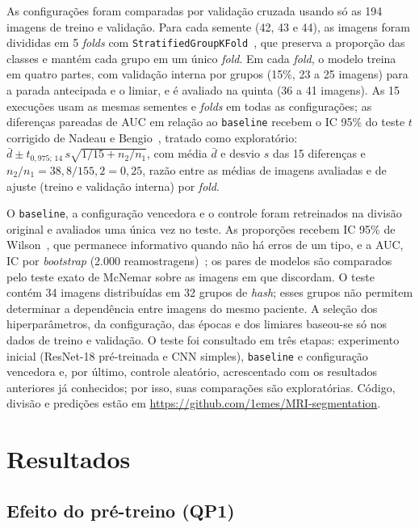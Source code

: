 \documentclass[conference]{IEEEtran}
\begin{document}
As configurações foram comparadas por validação cruzada usando só as 194 imagens de treino e validação. Para cada semente (42, 43 e 44), as imagens foram divididas em 5 \textit{folds} com \texttt{StratifiedGroupKFold}~\cite{pedregosa2011sklearn}, que preserva a proporção das classes e mantém cada grupo em um único \textit{fold}. Em cada \textit{fold}, o modelo treina em quatro partes, com validação interna por grupos (15\%, 23 a 25 imagens) para a parada antecipada e o limiar, e é avaliado na quinta (36 a 41 imagens). As 15 execuções usam as mesmas sementes e \textit{folds} em todas as configurações; as diferenças pareadas de AUC em relação ao \texttt{baseline} recebem o IC 95\% do teste $t$ corrigido de Nadeau e Bengio~\cite{nadeau2003inference}, tratado como exploratório: $\bar d \pm t_{0{,}975;\,14}\,s\sqrt{1/15 + n_2/n_1}$, com média $\bar d$ e desvio $s$ das 15 diferenças e $n_2/n_1 = 38{,}8/155{,}2 = 0{,}25$, razão entre as médias de imagens avaliadas e de ajuste (treino e validação interna) por \textit{fold}.

O \texttt{baseline}, a configuração vencedora e o controle foram retreinados na divisão original e avaliados uma única vez no teste. As proporções recebem IC 95\% de Wilson~\cite{brown2001interval}, que permanece informativo quando não há erros de um tipo, e a AUC, IC por \textit{bootstrap} (2.000 reamostragens)~\cite{efron1993bootstrap}; os pares de modelos são comparados pelo teste exato de McNemar sobre as imagens em que discordam. O teste contém 34 imagens distribuídas em 32 grupos de \textit{hash}; esses grupos não permitem determinar a dependência entre imagens do mesmo paciente. A seleção dos hiperparâmetros, da configuração, das épocas e dos limiares baseou-se só nos dados de treino e validação. O teste foi consultado em três etapas: experimento inicial (ResNet-18 pré-treinada e CNN simples), \texttt{baseline} e configuração vencedora e, por último, controle aleatório, acrescentado com os resultados anteriores já conhecidos; por isso, suas comparações são exploratórias. Código, divisão e predições estão em \url{https://github.com/1emes/MRI-segmentation}.





\section{Resultados}

\subsection{Efeito do pré-treino (QP1)}
\end{document}
